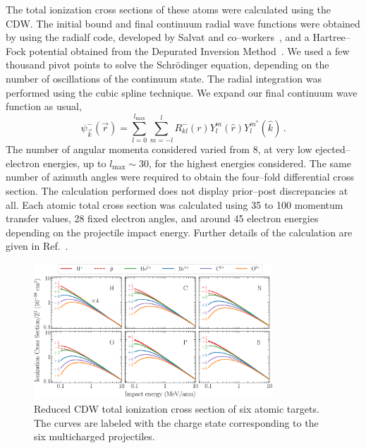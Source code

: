 \documentclass[10pt,showpacs,twocolumn]{revtex4}
\begin{document}
The total ionization cross sections of these atoms were calculated using 
the CDW. The initial bound and final continuum radial wave 
functions were obtained by using the {\sc radialf} code, developed by 
Salvat and co--workers~\cite{salvat1995}, and a Hartree--Fock potential 
obtained from the Depurated Inversion Method~\cite{mendez2016,mendez2018}. 
We used a few thousand pivot points to solve the Schr\"{o}dinger 
equation, depending on the number of oscillations of the continuum 
state. The radial integration was performed using the cubic spline 
technique. We expand our final continuum wave function as usual,
\begin{equation}
\psi_{\overrightarrow{k}}^{-}(\overrightarrow{r})=\sum_{l=0}^{l_{\max
}}\sum_{m=-l}^{l}R_{kl}^{-}(r)Y_{l}^{m}(\widehat{r})Y_{l}^{m^{\ast }}
(\widehat{k})\,.
\label{eq:contwave}
\end{equation}
The number of angular momenta considered varied from 8, at 
very low ejected--electron energies, up to $l_{\max}\sim 30$, 
for the highest energies 
considered. The same number of azimuth angles were required to obtain 
the four--fold differential cross section. The calculation performed does 
not display prior--post discrepancies at all. Each atomic total cross 
section was calculated using 35 to 100 momentum transfer values, 28 
fixed electron angles, and around 45 electron energies depending on the 
projectile impact energy. 
Further details of the calculation are given in Ref.~\cite{montanari2017}. 

\begin{figure}[t!]
\centering
\includegraphics[width=0.8\textwidth]{atomicscaling.eps}
\caption{Reduced CDW total ionization cross section of six atomic 
targets. The curves are labeled with the charge state corresponding to 
the six multicharged projectiles.}
\label{fig:atomscaling}
\end{figure} 
\end{document}
